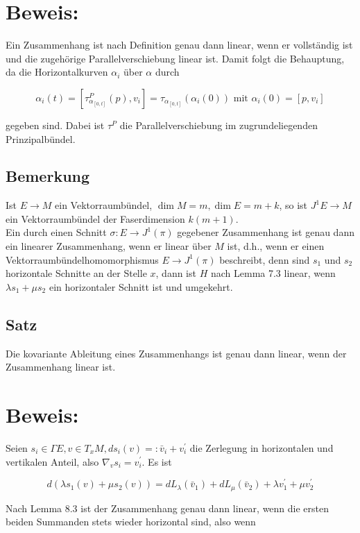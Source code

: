 \documentclass[10pt, letterpaper]{article}
\begin{document}
\section*{Beweis:}
Ein Zusammenhang ist nach Definition genau dann linear, wenn er vollständig ist und die zugehörige Parallelverschiebung linear ist. Damit folgt die Behauptung, da die Horizontalkurven $\alpha_{i}$ über $\alpha$ durch

$$
\alpha_{i}(t)=\left[\tau_{\alpha_{[0, t]}}^{P}(p), v_{i}\right]=\tau_{\alpha_{[0, t]}}\left(\alpha_{i}(0)\right) \text { mit } \alpha_{i}(0)=\left[p, v_{i}\right]
$$

gegeben sind. Dabei ist $\tau^{P}$ die Parallelverschiebung im zugrundeliegenden Prinzipalbündel.

\subsection*{Bemerkung}
Ist $E \rightarrow M$ ein Vektorraumbündel, $\operatorname{dim} M=m, \operatorname{dim} E=m+k$, so ist $J^{1} E \rightarrow M$ ein Vektorraumbündel der Faserdimension $k(m+1)$.\\
Ein durch einen Schnitt $\sigma: E \rightarrow J^{1}(\pi)$ gegebener Zusammenhang ist genau dann ein linearer Zusammenhang, wenn er linear über $M$ ist, d.h., wenn er einen Vektorraumbündelhomomorphismus $E \rightarrow J^{1}(\pi)$ beschreibt, denn sind $s_{1}$ und $s_{2}$ horizontale Schnitte an der Stelle $x$, dann ist $H$ nach Lemma 7.3 linear, wenn $\lambda s_{1}+\mu s_{2}$ ein horizontaler Schnitt ist und umgekehrt.

\subsection*{Satz}
Die kovariante Ableitung eines Zusammenhangs ist genau dann linear, wenn der Zusammenhang linear ist.

\section*{Beweis:}
Seien $s_{i} \in \Gamma E, v \in T_{x} M, d s_{i}(v)=: \bar{v}_{i}+v_{i}^{\prime}$ die Zerlegung in horizontalen und vertikalen Anteil, also $\nabla_{v} s_{i}=v_{i}^{\prime}$. Es ist

$$
d\left(\lambda s_{1}(v)+\mu s_{2}(v)\right)=d L_{\lambda}\left(\bar{v}_{1}\right)+d L_{\mu}\left(\bar{v}_{2}\right)+\lambda v_{1}^{\prime}+\mu v_{2}^{\prime}
$$

Nach Lemma 8.3 ist der Zusammenhang genau dann linear, wenn die ersten beiden Summanden stets wieder horizontal sind, also wenn
\end{document}
